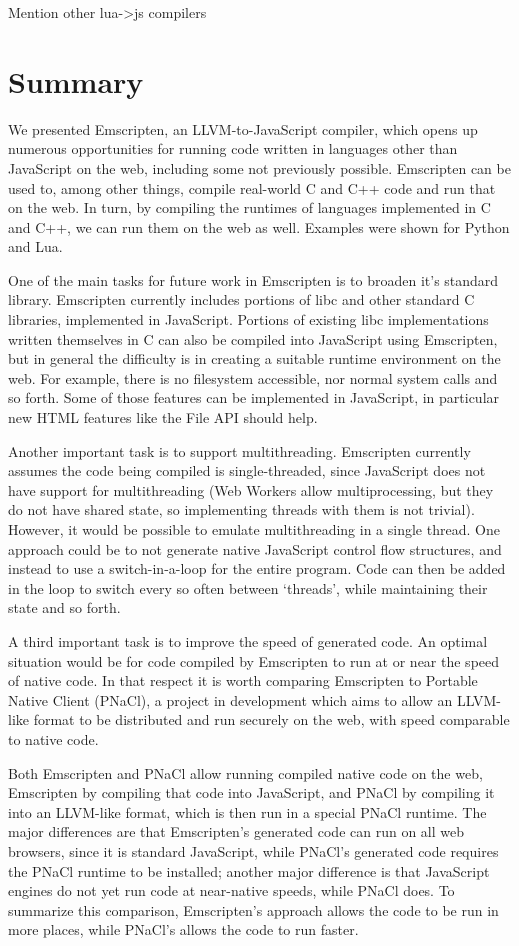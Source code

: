\documentclass[11pt]{proc}
\begin{document}
Mention other lua->js compilers

\section{Summary}

We presented Emscripten, an LLVM-to-JavaScript compiler, which opens up
numerous opportunities for running code written in languages other
than JavaScript on the web, including some not previously possible.
Emscripten can be used to, among other
things, compile real-world C and C++ code and run that on the web. In
turn, by compiling the runtimes of languages implemented in C and C++,
we can run them on the web as well. Examples were shown for Python and
Lua.

One of the main tasks for future work in Emscripten is to broaden it's
standard library. Emscripten currently includes portions of libc and
other standard C libraries, implemented in JavaScript. Portions of
existing libc implementations written themselves in C can also be
compiled into JavaScript using Emscripten, but in general the difficulty
is in creating a suitable runtime environment on the web. For example,
there is no filesystem accessible, nor normal system calls and so forth.
Some of those features can be implemented in JavaScript, in particular
new HTML features like the File API should help.

Another important task is to support multithreading. Emscripten
currently assumes the code being compiled is single-threaded, since
JavaScript does not have support for multithreading (Web Workers allow
multiprocessing, but they do not have shared state, so implementing
threads with them is not trivial). However, it would be possible
to emulate multithreading in a single thread. One approach could be
to not generate native JavaScript control flow structures, and instead
to use a switch-in-a-loop for the entire program. Code can then be
added in the loop to switch every so often between `threads', while
maintaining their state and so forth.

A third important task is to improve the speed of generated code. An
optimal situation would be for code compiled by Emscripten to run at
or near the speed of native code. In that respect it is worth comparing
Emscripten to Portable Native Client (PNaCl), a project in development which aims
to allow an LLVM-like format to be distributed and run securely
on the web, with speed comparable to native code.

Both Emscripten and PNaCl allow running compiled native code on
the web, Emscripten by compiling that code into JavaScript, and
PNaCl by compiling it into an LLVM-like format, which is then
run in a special PNaCl runtime. The major differences
are that Emscripten's generated code can run on all web browsers,
since it is standard JavaScript, while PNaCl's generated code
requires the PNaCl runtime to be installed; another major
difference is that JavaScript engines do not yet run code at
near-native speeds, while PNaCl does. To summarize this comparison, Emscripten's
approach allows the code to be run in more places, while PNaCl's
allows the code to run faster.
\end{document}
